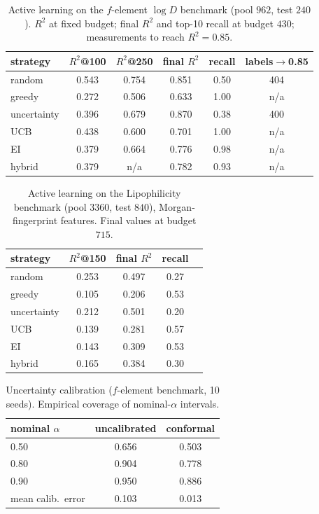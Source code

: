 \documentclass[journal=acsodf,manuscript=suppinfo]{achemso}
\begin{document}
\begin{table}[h]\centering
\caption{Active learning on the $f$-element $\log D$ benchmark (pool $962$,
test $240$). $R^2$ at fixed budget; final $R^2$ and top-10 recall at budget $430$;
measurements to reach $R^2\!=\!0.85$.}
\begin{tabular}{lccccc}
\toprule
strategy & $R^2$@100 & $R^2$@250 & final $R^2$ & recall & labels$\to$0.85 \\
\midrule
random      & 0.543 & 0.754 & 0.851 & 0.50 & 404 \\
greedy      & 0.272 & 0.506 & 0.633 & 1.00 & n/a \\
uncertainty & 0.396 & 0.679 & 0.870 & 0.38 & 400 \\
UCB         & 0.438 & 0.600 & 0.701 & 1.00 & n/a \\
EI          & 0.379 & 0.664 & 0.776 & 0.98 & n/a \\
hybrid      & 0.379 & n/a    & 0.782 & 0.93 & n/a \\
\bottomrule
\end{tabular}
\end{table}

\begin{table}[h]\centering
\caption{Active learning on the Lipophilicity benchmark (pool $3360$, test $840$),
Morgan-fingerprint features. Final values at budget $715$.}
\begin{tabular}{lcccc}
\toprule
strategy & $R^2$@150 & final $R^2$ & recall \\
\midrule
random      & 0.253 & 0.497 & 0.27 \\
greedy      & 0.105 & 0.206 & 0.53 \\
uncertainty & 0.212 & 0.501 & 0.20 \\
UCB         & 0.139 & 0.281 & 0.57 \\
EI          & 0.143 & 0.309 & 0.53 \\
hybrid      & 0.165 & 0.384 & 0.30 \\
\bottomrule
\end{tabular}
\end{table}

\begin{table}[h]\centering
\caption{Uncertainty calibration ($f$-element benchmark, 10 seeds). Empirical
coverage of nominal-$\alpha$ intervals.}
\begin{tabular}{lcc}
\toprule
nominal $\alpha$ & uncalibrated & conformal \\
\midrule
0.50 & 0.656 & 0.503 \\
0.80 & 0.904 & 0.778 \\
0.90 & 0.950 & 0.886 \\
\midrule
mean calib.\ error & 0.103 & 0.013 \\
\bottomrule
\end{tabular}
\end{table}
\end{document}
